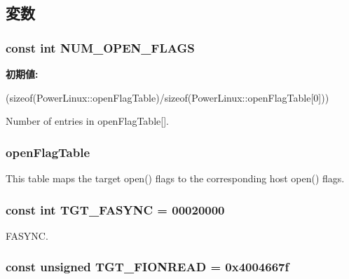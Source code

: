 \subsection{変数}
\hypertarget{classPowerLinux_ad85b9918c8f2c8739537a002dc1dc526}{
\subsubsection[{NUM\_\-OPEN\_\-FLAGS}]{\setlength{\rightskip}{0pt plus 5cm}const int {\bf NUM\_\-OPEN\_\-FLAGS}}}
\label{classPowerLinux_ad85b9918c8f2c8739537a002dc1dc526}
{\bfseries 初期値:}
\begin{DoxyCode}

        (sizeof(PowerLinux::openFlagTable)/sizeof(PowerLinux::openFlagTable[0]))
\end{DoxyCode}


Number of entries in openFlagTable\mbox{[}\mbox{]}. \hypertarget{classPowerLinux_ab1db5a531609b99b262cc849ea24765a}{
\subsubsection[{openFlagTable}]{ {\bf openFlagTable}}}
\label{classPowerLinux_ab1db5a531609b99b262cc849ea24765a}
This table maps the target open() flags to the corresponding host open() flags. \hypertarget{classPowerLinux_ab23d73086673a1279fc508b68fc47191}{
\subsubsection[{TGT\_\-FASYNC}]{\setlength{\rightskip}{0pt plus 5cm}const int {\bf TGT\_\-FASYNC} = 00020000}}
\label{classPowerLinux_ab23d73086673a1279fc508b68fc47191}


FASYNC. \hypertarget{classPowerLinux_a1def346ff527c8efccfd52463f3b5dc1}{
\subsubsection[{TGT\_\-FIONREAD}]{\setlength{\rightskip}{0pt plus 5cm}const unsigned {\bf TGT\_\-FIONREAD} = 0x4004667f}}
\label{classPowerLinux_a1def346ff527c8efccfd52463f3b5dc1}


